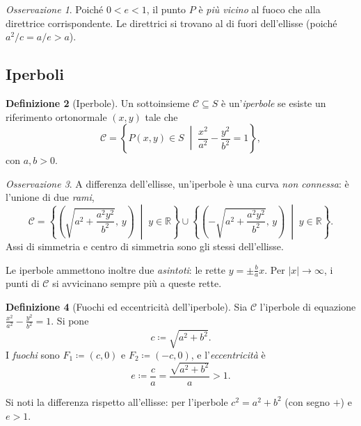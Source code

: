 \documentclass[11pt, a4paper]{book}
\theoremstyle{definition}
\newtheorem{definizione}{Definizione}[section]
\theoremstyle{plain}
\theoremstyle{remark}
\newtheorem{osservazione}[definizione]{Osservazione}
\newcommand{\R}{\mathbb{R}}
\begin{document}
\begin{osservazione}
Poiché $0 < e < 1$, il punto $P$ è \emph{più vicino} al fuoco che alla direttrice corrispondente. Le direttrici si trovano al di fuori dell'ellisse (poiché $a^2/c = a/e > a$).
\end{osservazione}

\subsection{Iperboli}

\begin{defbox}
\begin{definizione}[Iperbole]
\label{def:iperbole}
Un sottoinsieme $\mathcal{C} \subseteq S$ è un'\emph{iperbole} se esiste un riferimento ortonormale $(x,y)$ tale che
\[
  \mathcal{C} = \left\{ P(x,y) \in S \;\middle|\; \frac{x^2}{a^2} - \frac{y^2}{b^2} = 1 \right\},
\]
con $a, b > 0$.
\end{definizione}
\end{defbox}

\begin{osservazione}
A differenza dell'ellisse, un'iperbole è una curva \emph{non connessa}: è l'unione di due \emph{rami},
\[
  \mathcal{C} = \left\{ \left(\sqrt{a^2 + \frac{a^2 y^2}{b^2}},\, y\right) \;\middle|\; y \in \R \right\}
  \cup
  \left\{ \left(-\sqrt{a^2 + \frac{a^2 y^2}{b^2}},\, y\right) \;\middle|\; y \in \R \right\}.
\]
Assi di simmetria e centro di simmetria sono gli stessi dell'ellisse.

Le iperbole ammettono inoltre due \emph{asintoti}: le rette $y = \pm \frac{b}{a} x$. Per $|x| \to \infty$, i punti di $\mathcal{C}$ si avvicinano sempre più a queste rette.
\end{osservazione}

\begin{defbox}
\begin{definizione}[Fuochi ed eccentricità dell'iperbole]
\label{def:fuochi-iper}
Sia $\mathcal{C}$ l'iperbole di equazione $\frac{x^2}{a^2}-\frac{y^2}{b^2}=1$. Si pone
\[
  c \coloneqq \sqrt{a^2 + b^2}.
\]
I \emph{fuochi} sono $F_1 \coloneqq (c,0)$ e $F_2 \coloneqq (-c,0)$, e l'\emph{eccentricità} è
\[
  e \coloneqq \frac{c}{a} = \frac{\sqrt{a^2+b^2}}{a} > 1.
\]
\end{definizione}
\end{defbox}

Si noti la differenza rispetto all'ellisse: per l'iperbole $c^2 = a^2 + b^2$ (con segno $+$) e $e > 1$.
\end{document}

